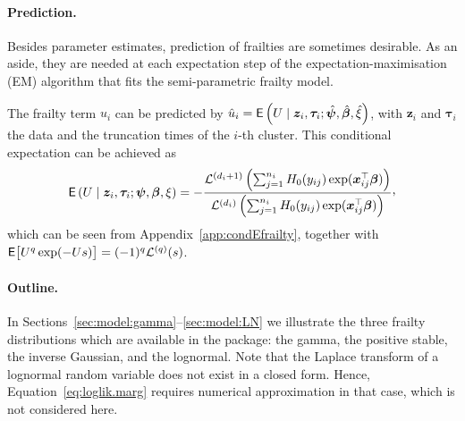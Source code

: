 \paragraph{Prediction.}
Besides parameter estimates, prediction of frailties are sometimes desirable.
  As an aside, they are needed at each expectation step of the expectation-maximisation (EM) algorithm that fits
  the semi-parametric frailty model.

The frailty term $u_i$ can be predicted by
  $\hat u_i = \mathsf{E}\left( U \mid \bm z_i, \bm \tau_i ; \hat{\bm\psi}, \hat{\bm\beta}, \hat\xi \right)$, 
  with $\bm z_i$ and $\bm \tau_i$ the data and the truncation times of the $i$-th cluster.
This conditional expectation can be achieved as 
  \begin{equation*}
    \E\left( U \mid \bm z_i, \bm \tau_i ; \bm\psi, \bm\beta, \xi \right) =
    - \frac{
      \mathcal L^{(d_i + 1)} \left(
          \sum_{j=1}^{n_i}  H_0(y_{ij})
            \exp(\bm x_{ij}^\top \bm\beta)
        \right)
    }{
      \mathcal L^{(d_i)} \left(
          \sum_{j=1}^{n_i} H_0(y_{ij})
            \exp(\bm x_{ij}^\top \bm\beta)
        \right)
    }\ccom
  \end{equation*}
  which can be seen from Appendix~\ref{app:condEfrailty}, together with 
  $\mathsf{E}\big[ U^q \exp(-Us) \big] = (-1)^q \mathcal L^{(q)}(s)$.


\paragraph{Outline.}
In Sections~\ref{sec:model:gamma}--\ref{sec:model:LN} we illustrate the three frailty distributions
  which are available in the  package: 
  the gamma, the positive stable, the inverse Gaussian, and the lognormal.
Note that the Laplace transform of a lognormal random variable does not exist in a closed form.
Hence, Equation~\ref{eq:loglik.marg} requires numerical approximation in that case, which is not considered here.
  